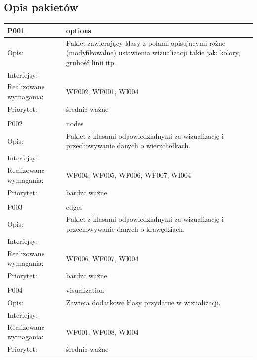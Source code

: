 \documentclass[a4paper,10pt]{article}
\begin{document}
\subsection{Opis pakietów}


\begin{center}
\begin{longtable}{|m{3cm}|m{9cm}|} \hline

P001 & options\\ \hline
Opis: & Pakiet zawierający klasy z polami opisującymi różne (modyfikowalne) ustawienia wizualizacji takie jak: kolory, grubość linii itp.     \\ \hline
Interfejsy: &     \\ \hline
Realizowane wymagania: & WF002, WF001, WI004 \\ \hline
Priorytet: & średnio ważne \\ \hline

\multicolumn{2}{c}{} \\
 \hline

P002 & nodes\\ \hline
Opis: & Pakiet z klasami odpowiedzialnymi za wizualizację i przechowywanie danych o wierzchołkach.    \\ \hline
Interfejsy: &     \\ \hline
Realizowane wymagania: & WF004, WF005, WF006, WF007, WI004 \\ \hline
Priorytet: & bardzo ważne \\ \hline

\multicolumn{2}{c}{} \\
 \hline

P003 & edges\\ \hline
Opis: & Pakiet z klasami odpowiedzialnymi za wizualizację i przechowywanie danych o krawędziach.    \\ \hline
Interfejsy: &     \\ \hline
Realizowane wymagania: & WF006, WF007, WI004 \\ \hline
Priorytet: & bardzo ważne \\ \hline

\multicolumn{2}{c}{} \\
 \hline

P004 & visualization\\ \hline
Opis: & Zawiera dodatkowe klasy przydatne w wizualizacji.\\ \hline
Interfejsy: &     \\ \hline
Realizowane wymagania: & WF001, WF008, WI004 \\ \hline
Priorytet: & średnio ważne \\ \hline


\end{longtable}
\end{center}
\end{document}
